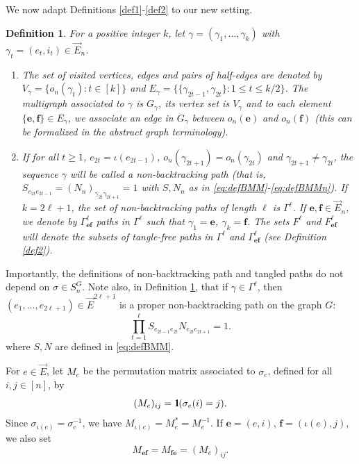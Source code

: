 \documentclass[11pt]{article}
\newtheorem{definition}[lemma]{Definition}
\newcommand{\cE}{E}
\newcommand{\1}{1\!\!{\sf I}}\newcommand{\IND}{\1}
\newcommand{\Be}{\bm{e}}
\newcommand{\Bf}{\bm{f}}
\begin{document}
We now adapt Definitions \ref{def1}-\ref{def2} to our new setting.

\begin{definition}\label{defM1}
For a positive integer $k$, let $ \gamma = (\gamma_1 , \ldots, \gamma_k) $ with $\gamma_t  = ( e_t,  i_t) \in \vec E_n$.
\begin{enumerate}[-]
\item 
The set of visited vertices, edges and pairs of half-edges are denoted by  $V_\gamma= \{ o_n(\gamma_t) : t \in [k]\}$ and $\cE_\gamma =\{ \{\gamma_{2t-1} ,  \gamma_{2t} \}   : 1 \leq t \leq k/2\}$. The multigraph associated to $\gamma$ is $ G_\gamma$, its vertex set is $V_\gamma$ and to each element $ \{\Be, \Bf \} \in \cE_\gamma$, we associate an edge in $G_\gamma$ between $o_n(\Be)$ and $o_n(\Bf)$ (this can be formalized in the abstract graph terminology). 
\item 
If for all $t \geq 1$, $e_{2t } = \iota(e_{2t-1})$, $ o_n(\gamma_{2t+1}) = o_n(\gamma_{2t})$ and $\gamma_{2t+1} \ne \gamma_{2t}$, the sequence $\gamma$ will be called a {\em non-backtracking path} (that is, $S_{e_{2t} e_{2t-1}} = (N_n)_{\gamma_{2t} \gamma_{2t+1}} = 1$ with $S,N_n$ as in \eqref{eq:defBMM}-\eqref{eq:defBMMn}). 
If  $k = 2 \ell +1$, the set of non-backtracking paths of length $\ell$ is $\Gamma^{\ell}$.  If $\Be, \Bf \in \vec E_n$, we denote by $\Gamma^{\ell}_{\Be \Bf}$  paths in $\Gamma^\ell$ such that $\gamma_1 = \Be$, $\gamma_k  = \Bf$.
The sets $F^{\ell}$ and $F^{\ell} _{\Be \Bf}$ will denote the subsets of tangle-free paths in $\Gamma^{\ell}$ and $\Gamma^{\ell}_{\Be \Bf}$ (see Definition \ref{def2}).
\end{enumerate}
\end{definition}

Importantly, the definitions of  non-backtracking path and tangled paths do not depend on  $\sigma \in S_n^G$. Note also, in Definition \ref{defM1}, that if $\gamma \in \Gamma^{\ell}$, then $(e_1, \ldots, e_{2\ell +1}) \in \vec E ^{2\ell +1}$ is a proper non-backtracking path on the graph $G$:
$$
\prod_{t=1}^{\ell} S_{e_{2t-1} e_{2t}} N_{e_{2t} e_{2t+1}}   = 1.
$$
where $S,N$ are defined in \eqref{eq:defBMM}.

For $e   \in \vec E$, let $M_{e}$  be the permutation matrix associated to $\sigma_{e}$, defined for all $i,j \in [n]$, by
\begin{equation}\label{eqM:defM}
(M_{e})_{i j} =\IND ( \sigma_e(i) =  j) .
\end{equation}
Since $\sigma_{\iota(e)} = \sigma^{-1}_e$, we have $M_{\iota(e)} = M^*_e = M_e ^{-1}$.  If $\Be = (e,i)$, $\Bf  = (\iota(e) ,j)$, we also set 
$$
M_{\Be \Bf} = M_{\Bf \Be} = (M_{e} )_{i j}.  
$$
\end{document}
